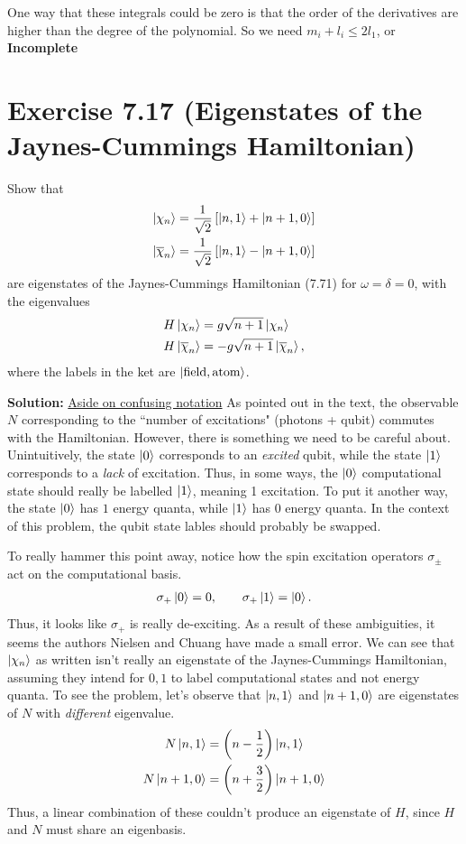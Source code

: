 \documentclass{book}
\begin{document}
    One way that these integrals could be zero is that the order of the derivatives are higher than the degree of the polynomial. So we need $m_i + l_i \leq 2l_1$, or \textbf{Incomplete}


\section*{Exercise 7.17 (Eigenstates of the Jaynes-Cummings Hamiltonian)}
    Show that 
    \begin{align}
        \ket{\chi_n} = \frac{1}{\sqrt{2}}\left[\ket{n,1} + \ket{n+1,0}\right] \\
        \ket{\overline{\chi}_n} = \frac{1}{\sqrt{2}}\left[\ket{n,1} - \ket{n+1,0}\right]
    \end{align}
    are eigenstates of the Jaynes-Cummings Hamiltonian (7.71) for $\omega = \delta = 0$, with the eigenvalues
    \begin{align}
        H \ket{\chi_n} &= g\sqrt{n+1} \ket{\chi_n} \\
        H\ket{\overline{\chi}_n} &= -g\sqrt{n+1}\ket{\overline{\chi}_n},
    \end{align}
    where the labels in the ket are $\ket{\text{field}, \text{atom}}$.

    \textbf{Solution:} \underline{Aside on confusing notation} As pointed out in the text, the observable $N$ corresponding to the ``number of excitations" (photons + qubit) commutes with the Hamiltonian. However, there is something we need to be careful about. Unintuitively, the state $\ket{0}$ corresponds to an \emph{excited} qubit, while the state $\ket{1}$ corresponds to a \emph{lack} of excitation. Thus, in some ways, the $\ket{0}$ computational state should really be labelled $\ket{1}$, meaning 1 excitation. To put it another way, the state $\ket{0}$ has $1$ energy quanta, while $\ket{1}$ has $0$ energy quanta. In the context of this problem, the qubit state lables should probably be swapped. 

    To really hammer this point away, notice how the spin excitation operators $\sigma_\pm$ act on the computational basis.
    \begin{align}
        \sigma_+ \ket{0} = 0, \qquad \sigma_+ \ket{1} = \ket{0}.
    \end{align}
    Thus, it looks like $\sigma_+$ is really de-exciting. As a result of these ambiguities, it seems the authors Nielsen and Chuang have made a small error. We can see that $\ket{\chi_n}$ as written isn't really an eigenstate of the Jaynes-Cummings Hamiltonian, assuming they intend for $0,1$ to label computational states and not energy quanta. To see the problem, let's observe that $\ket{n,1}$ and $\ket{n+1, 0}$ are eigenstates of $N$ with \emph{different} eigenvalue.
    \begin{align}
    \begin{aligned}
        N \ket{n,1} &= \left(n - \frac{1}{2}\right) \ket{n,1} \\
        N \ket{n+1, 0} &= \left(n+\frac{3}{2}\right) \ket{n+1,0}
    \end{aligned}
    \end{align}
    Thus, a linear combination of these couldn't produce an eigenstate of $H$, since $H$ and $N$ must share an eigenbasis. 
\end{document}
